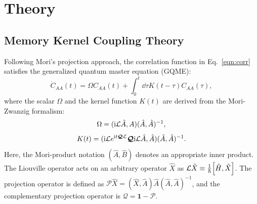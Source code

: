 \documentclass[preprint,aip,jcp]{revtex4-2}
\newcommand{\im}{\textup{i}}
\newcommand{\Lv}{\mathcal{L}}
\newcommand{\Proj}{\bm{\mathcal{P}}}
\newcommand{\Qroj}{\bm{\mathcal{Q}}}
\begin{document}
\section{\label{sec:theory}Theory}
\subsection{Memory Kernel Coupling Theory\label{subsec:mkct}}
Following Mori's projection approach, \cite{mori1965projection} the correlation function in Eq.~\ref{eqn:corr} satisfies the generalized quantum master equation (GQME):  
\begin{equation}
    \dot{C}_{AA}(t) = \Omega C_{AA}(t) + \int_{0}^{t} \dd{\tau} K(t - \tau) C_{AA}(\tau), 
\end{equation}
where the scalar $\Omega$ and the kernel function $K(t)$ are derived from the Mori-Zwanzig formalism:
\begin{equation}
    \Omega = (\im \Lv \hat{A}, A) (\hat{A}, \hat{A})^{-1},
\end{equation}
\begin{equation}
    K(t) = (\im \Lv e^{\im t \Qroj \Lv} \Qroj \im \Lv \hat{A}, \hat{A}) (\hat{A}, \hat{A})^{-1}.
\end{equation}
Here, the Mori-product notation $(\hat{A}, \hat{B})$ denotes an appropriate inner product. The Liouville operator acts on an arbitrary operator $\hat{X}$ as $\Lv \hat{X} \equiv \frac{1}{\hbar} \comm{\hat{H}}{\hat{X}}$. The projection operator is defined as $\Proj \hat{X} = (\hat{X}, \hat{A}) \hat{A} (\hat{A}, \hat{A})^{-1}$, and the complementary projection operator is $\Qroj = \bm{1} - \Proj$.

\end{document}
